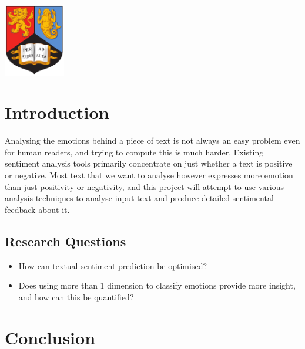 \documentclass{article}
\begin{document}
\begin{titlepage}
	
	\includegraphics[width=0.2\textwidth]{litImgs/birmingham.png}\\[1cm] %
	 
	
	\vfill %
	
\end{titlepage}


\tableofcontents

\pagebreak

\section{Introduction}

Analysing the emotions behind a piece of text is not always an easy problem even for human readers, and trying to compute this is much harder. Existing sentiment analysis tools primarily concentrate on just whether a text is positive or negative. \cite{kolchyna2015twitter}
Most text that we want to analyse however expresses more emotion than just positivity or negativity, and this project will attempt to use various analysis techniques to analyse input text and produce detailed sentimental feedback about it.

\subsection{Research Questions}
\begin{itemize}
    \item How can textual sentiment prediction be optimised?
    \item Does using more than 1 dimension to classify emotions provide more insight, and how can this be quantified?

\end{itemize}





\section{Conclusion}

\pagebreak






\end{document}
